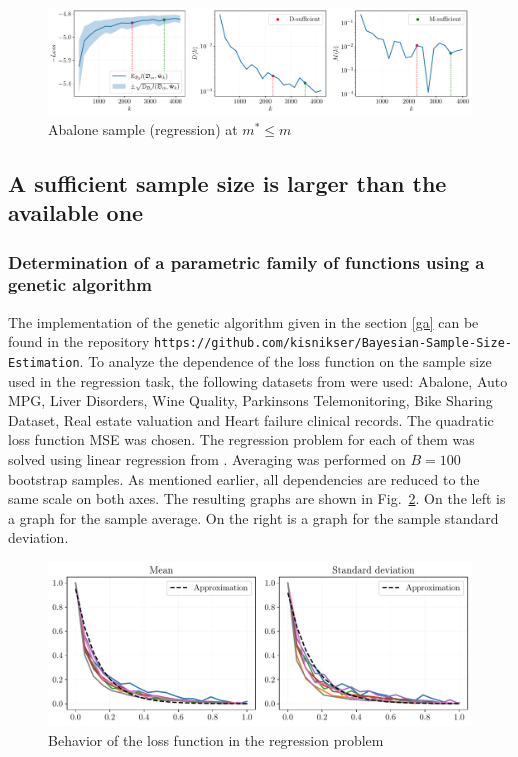 \documentclass[
11pt,%
tightenlines,%
twoside,%
onecolumn,%
nofloats,%
nobibnotes,%
nofootinbib,%
superscriptaddress,%
noshowpacs,%
centertags]%
{revtex4-2}
\begin{document}
\begin{figure}[h!]
    \centering
    \includegraphics[width=\textwidth]{paper/figures/abalone-sufficient.pdf}
    \caption{Abalone sample (regression) at $m^*\leqslant m$}
    \label{abalone-sufficient}
\end{figure}

\subsection{A sufficient sample size is larger than the available one}

\subsubsection{Determination of a parametric family of functions using a genetic algorithm}

The implementation of the genetic algorithm given in the section \ref{ga} can be found in the repository \texttt{https://github.com/kisnikser/Bayesian-Sample-Size-Estimation}. To analyze the dependence of the loss function on the sample size used in the regression task, the following datasets from \citep{UCI} were used: Abalone, Auto MPG, Liver Disorders, Wine Quality, Parkinsons Telemonitoring, Bike Sharing Dataset, Real estate valuation and Heart failure clinical records. The quadratic loss function MSE was chosen. The regression problem for each of them was solved using linear regression from \citep{scikit-learn}. Averaging was performed on $B = 100$ bootstrap samples. As mentioned earlier, all dependencies are reduced to the same scale on both axes. The resulting graphs are shown in Fig.~\ref{datasets_regression}. On the left is a graph for the sample average. On the right is a graph for the sample standard deviation.

\begin{figure}[h!]
    \centering
    \includegraphics[width=\textwidth]{paper/figures/datasets_regression.pdf}
    \caption{Behavior of the loss function in the regression problem}
    \label{datasets_regression}
\end{figure}
\end{document}
